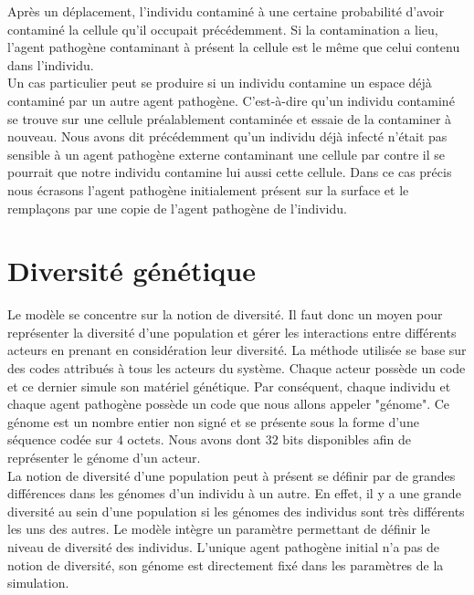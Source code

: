 Après un déplacement, l'individu contaminé à une certaine probabilité d'avoir contaminé la cellule qu'il occupait précédemment. Si la contamination a lieu, l'agent pathogène contaminant à présent la cellule est le même que celui contenu dans l'individu.\\

Un cas particulier peut se produire si un individu contamine un espace déjà contaminé par un autre agent pathogène. C'est-à-dire qu'un individu contaminé se trouve sur une cellule préalablement contaminée et essaie de la contaminer à nouveau. Nous avons dit précédemment qu'un individu déjà infecté n'était pas sensible à un agent pathogène externe contaminant une cellule par contre il se pourrait que notre individu contamine lui aussi cette cellule. Dans ce cas précis nous écrasons l'agent pathogène initialement présent sur la surface et le remplaçons par une copie de l'agent pathogène de l'individu.

\section{Diversité génétique}

Le modèle se concentre sur la notion de diversité. Il faut donc un moyen pour représenter la diversité d'une population et gérer les interactions entre différents acteurs en prenant en considération leur diversité. La méthode utilisée se base sur des codes attribués à tous les acteurs du système. Chaque acteur possède un code et ce dernier simule son matériel génétique. Par conséquent, chaque individu et chaque agent pathogène possède un code que nous allons appeler "génome". Ce génome est un nombre entier non signé et se présente sous la forme d'une séquence codée sur $4$ octets. Nous avons dont $32$ bits disponibles afin de représenter le génome d'un acteur.\\

La notion de diversité d'une population peut à présent se définir par de grandes différences dans les génomes d'un individu à un autre. En effet, il y a une grande diversité au sein d'une population si les génomes des individus sont très différents les uns des autres. Le modèle intègre un paramètre permettant de définir le niveau de diversité des individus. L'unique agent pathogène initial n'a pas de notion de diversité, son génome est directement fixé dans les paramètres de la simulation.\\

